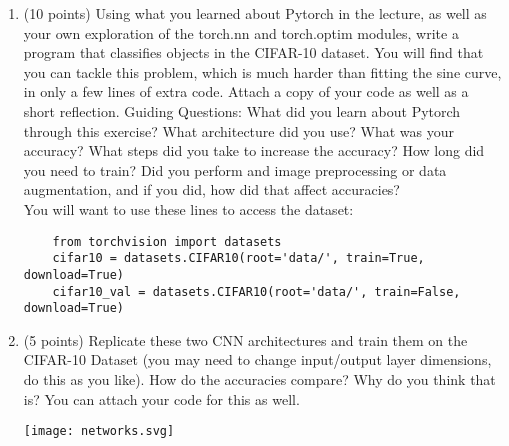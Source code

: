 \documentclass{article}
\author{Tarushii Goel}
\date{2020}
\begin{document}
\begin{center}
\end{center}
 
\vspace{5mm}
 
 
\vspace{5mm}

\begin{enumerate}
	\item (10 points) Using what you learned about Pytorch in the lecture, as well as your own exploration of the torch.nn and torch.optim modules, write a program that classifies objects in the CIFAR-10 dataset. You will find that you can tackle this problem, which is much harder than fitting the sine curve, in only a few lines of extra code. Attach a copy of your code as well as a short reflection. Guiding Questions: What did you learn about Pytorch through this exercise? What architecture did you use? What was your accuracy? What steps did you take to increase the accuracy? How long did you need to train? Did you perform and image preprocessing or data augmentation, and if you did, how did that affect accuracies? \\ 
	You will want to use these lines to access the dataset:
	\begin{lstlisting}
	from torchvision import datasets
	cifar10 = datasets.CIFAR10(root='data/', train=True, download=True)
	cifar10_val = datasets.CIFAR10(root='data/', train=False, download=True) \end{lstlisting}
	\pagebreak
	\item (5 points) Replicate these two CNN architectures and train them on the CIFAR-10 Dataset (you may need to change input/output layer dimensions, do this as you like). How do the accuracies compare? Why do you think that is? You can attach your code for this as well. 
\begin{center}
\texttt{[image: networks.svg]}
\end{center}

\end {enumerate}
\end{document}
